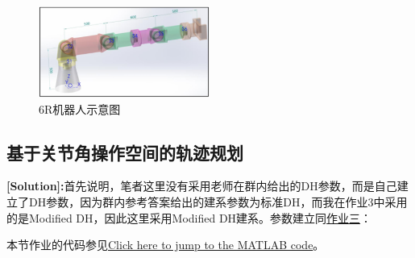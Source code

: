 \documentclass{ctexart}
\begin{document}
\begin{figure}[h]
	\centering
	\includegraphics[width=0.5\textwidth]{Image/3.png}
	\caption{6R机器人示意图}
\end{figure}

\subsection{基于关节角操作空间的轨迹规划}
\textcolor{cherry}{\textbf{[Solution]:}首先说明，笔者这里没有采用老师在群内给出的DH参数，而是自己建立了DH参数，因为群内参考答案给出的建系参数为标准DH，而我在作业3中采用的是Modified DH，因此这里采用Modified DH建系。}参数建立同\href{https://github.com/Racheus/Robotics-Caprice/tree/master/Homework3-Kinematics}{作业三}：

\begin{table}[h]
	\centering
	\caption{6R机器人MDH参数表}
	\end{table}

本节作业的代码参见\href{src/Rhw_5_2_1_main.m}{Click here to jump to the MATLAB code}。
\end{document}
